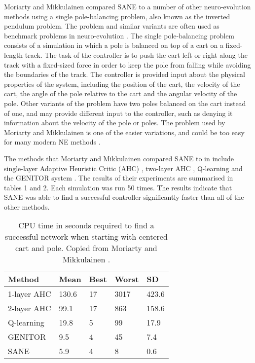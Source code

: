\documentclass[12pt]{article} %
\begin{document}
Moriarty and Mikkulainen \cite{Moriarty1996} compared SANE to a number of other neuro-evolution methods using a single pole-balancing problem, also known as the inverted pendulum problem. The problem and similar variants are often used as benchmark problems in neuro-evolution \cite{Gomez1997}\cite{Igel2003}\cite{Stanley2002}. The single pole-balancing problem consists of a simulation in which a pole is balanced on top of a cart on a fixed-length track. The task of the controller is to push the cart left or right along the track with a fixed-sized force in order to keep the pole from falling while avoiding the boundaries of the track. The controller is provided input about the physical properties of the system, including the position of the cart, the velocity of the cart, the angle of the pole relative to the cart and the angular velocity of the pole. Other variants of the problem have two poles balanced on the cart instead of one, and may provide different input to the controller, such as denying it information about the velocity of the pole or poles. The problem used by Moriarty and Mikkulainen is one of the easier variations, and could be too easy for many modern NE methods \cite{Stanley2002}.

The methods that Moriarty and Mikkulainen compared SANE to in \cite{Moriarty1996} include single-layer Adaptive Heuristic Critic (AHC) \cite{Barto1983}, two-layer AHC \cite{Anderson1987}, Q-learning \cite{Watkins1992} and the GENITOR system \cite{Whitley1994}. The results of their experiments are summarised in tables 1 and 2. Each simulation was run 50 times. The results indicate that SANE was able to find a successful controller significantly faster than all of the other methods.

\begin{table} \centering
    \begin{tabular}{|l|l|l|l|l|}
    \hline
    Method      & Mean  & Best & Worst & SD    \\ \hline
    1-layer AHC & 130.6 & 17   & 3017  & 423.6 \\ \hline
    2-layer AHC & 99.1  & 17   & 863   & 158.6 \\ \hline
    Q-learning  & 19.8  & 5    & 99    & 17.9  \\ \hline
    GENITOR     & 9.5   & 4    & 45    & 7.4   \\ \hline
    SANE        & 5.9   & 4    & 8     & 0.6   \\ \hline
    \end{tabular}
    \caption {CPU time in seconds required to find a successful network when starting with centered cart and pole. Copied from Moriarty and Mikkulainen \cite{Moriarty1996}.}
\end{table}
\end{document}
